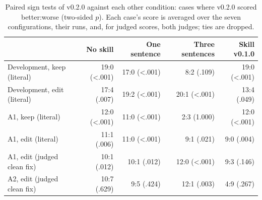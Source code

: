 \begin{table}[t]\centering\small
\caption{Paired sign tests of v0.2.0 against each other condition: cases where v0.2.0 scored better:worse (two-sided $p$). Each case's score is averaged over the seven configurations, their runs, and, for judged scores, both judges; ties are dropped.}\label{tab:signs}
\begin{tabular}{lrrrr}
\toprule
 & No skill & One sentence & Three sentences & Skill v0.1.0 \\
\midrule
Development, keep (literal) & 19:0 (<.001) & 17:0 (<.001) & 8:2 (.109) & 19:0 (<.001) \\
Development, edit (literal) & 17:4 (.007) & 19:2 (<.001) & 20:1 (<.001) & 13:4 (.049) \\
A1, keep (literal) & 12:0 (<.001) & 11:0 (<.001) & 2:3 (1.000) & 12:0 (<.001) \\
A1, edit (literal) & 11:1 (.006) & 11:0 (<.001) & 9:1 (.021) & 9:0 (.004) \\
A1, edit (judged clean fix) & 10:1 (.012) & 10:1 (.012) & 12:0 (<.001) & 9:3 (.146) \\
A2, edit (judged clean fix) & 10:7 (.629) & 9:5 (.424) & 12:1 (.003) & 4:9 (.267) \\
\bottomrule
\end{tabular}
\end{table}

